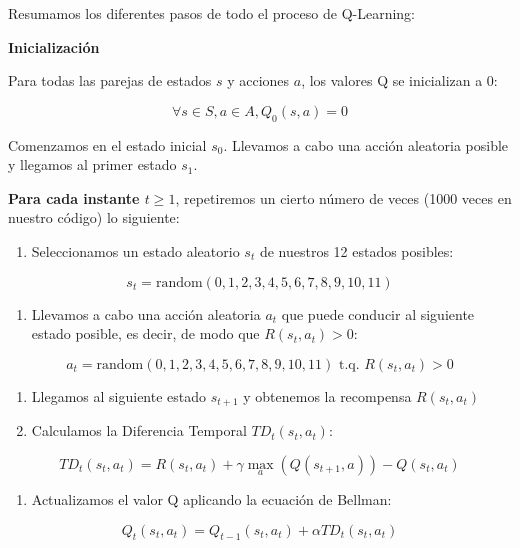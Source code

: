 \documentclass[
]{book}
\providecommand{\tightlist}{%
  \setlength{\itemsep}{0pt}\setlength{\parskip}{0pt}}
\begin{document}
Resumamos los diferentes pasos de todo el proceso de Q-Learning:

\textbf{Inicialización}

Para todas las parejas de estados \(s\) y acciones \(a\), los valores Q se inicializan a 0:

\[\forall s \in S, a \in A, Q_0(s,a) = 0\]

Comenzamos en el estado inicial \(s_0\). Llevamos a cabo una acción aleatoria posible y llegamos al primer estado \(s_1\).

\textbf{Para cada instante \(t \ge 1\)}, repetiremos un cierto número de veces (1000 veces en nuestro código) lo siguiente:

\begin{enumerate}
\def\labelenumi{\arabic{enumi}.}
\tightlist
\item
  Seleccionamos un estado aleatorio \(s_t\) de nuestros 12 estados posibles:
\end{enumerate}

\[s_t = \textrm{random}(0,1,2,3,4,5,6,7,8,9,10,11)\]

\begin{enumerate}
\def\labelenumi{\arabic{enumi}.}
\setcounter{enumi}{1}
\tightlist
\item
  Llevamos a cabo una acción aleatoria \(a_t\) que puede conducir al siguiente estado posible, es decir, de modo que \(R(s_t,a_t) > 0\):
\end{enumerate}

\[a_t = \textrm{random}(0,1,2,3,4,5,6,7,8,9,10,11) \textrm{ t.q. } R(s_t,a_t) > 0\]

\begin{enumerate}
\def\labelenumi{\arabic{enumi}.}
\setcounter{enumi}{2}
\item
  Llegamos al siguiente estado \(s_{t + 1}\) y obtenemos la recompensa \(R(s_t,a_t)\)
\item
  Calculamos la Diferencia Temporal \(TD_t(s_t,a_t)\):
\end{enumerate}

\[TD_t(s_t,a_t) = R(s_t,a_t) + \gamma \underset{a}{\max}(Q(s_{t+1},a)) - Q(s_t, a_t)\]

\begin{enumerate}
\def\labelenumi{\arabic{enumi}.}
\setcounter{enumi}{4}
\tightlist
\item
  Actualizamos el valor Q aplicando la ecuación de Bellman:
\end{enumerate}

\[Q_t(s_t,a_t) = Q_{t-1}(s_t,a_t) + \alpha TD_t(s_t,a_t)\]
\end{document}
